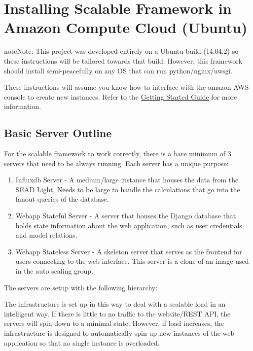 \documentclass[letterpaper,10pt,english]{sphinxmanual}
\begin{document}
\section{Installing Scalable Framework in Amazon Compute Cloud (Ubuntu)}
\label{installation:installing-scalable-framework-in-amazon-compute-cloud-ubuntu}
\begin{notice}{note}{Note:}
This project was developed entirely on a Ubuntu build (14.04.2) so these instructions will be tailored towards that build. However, this framework should install semi-peacefully on any OS that can run python/nginx/uwsgi.

These instructions will assume you know how to interface with the amazon AWS console to create new instances. Refer to the \href{http://docs.aws.amazon.com/AWSEC2/latest/UserGuide/EC2\_GetStarted.html}{Getting Started Guide} for more information.
\end{notice}


\subsection{Basic Server Outline}
\label{installation:basic-server-outline}
For the scalable framework to work correctly, there is a bare minimum of 3 servers that need to be always running. Each server has a unique purpose:
\begin{enumerate}
\item {} 
Influxdb Server - A medium/large instance that houses the data from the SEAD Light. Needs to be large to handle the calculations that go into the fanout queries of the database.

\item {} 
Webapp Stateful Server - A server that houses the Django database that holds state information about the web application, such as user credentials and model relations.

\item {} 
Webapp Stateless Server - A skeleton server that serves as the frontend for users connecting to the web interface. This server is a clone of an image used in the auto scaling group.

\end{enumerate}

The servers are setup with the following hierarchy:

The infrastructure is set up in this way to deal with a scalable load in an intelligent way. If there is little to no traffic to the website/REST API, the servers will spin down to a minimal state. However, if load increases, the infrastructure is designed to automatically spin up new instances of the web application so that no single instance is overloaded.
\end{document}
